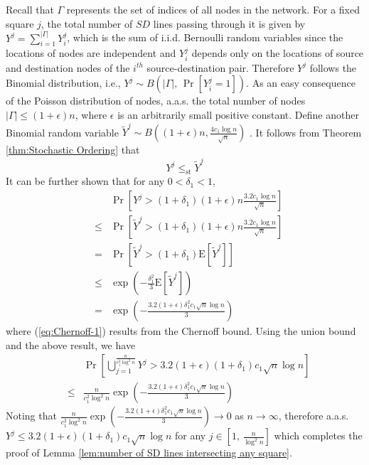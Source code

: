 \documentclass[english]{IEEEtran}
\theoremstyle{plain}
\theoremstyle{plain}
\theoremstyle{plain}
\theoremstyle{remark}
\begin{document}
Recall that $\Gamma$ represents the set of indices of all nodes in
the network. For a fixed square $j$, the total number of $SD$ lines
passing through it is given by $Y^{j}=\sum_{i=1}^{\left|\Gamma\right|}Y_{i}^{j}$,
which is the sum of i.i.d. Bernoulli random variables since the locations
of nodes are independent and $Y_{i}^{j}$ depends only on the locations
of source and destination nodes of the $i^{th}$ source-destination
pair. Therefore $Y^{j}$ follows the Binomial distribution, i.e.,
$Y^{j}\sim B\left(\left|\Gamma\right|,\,\Pr\left[Y_{i}^{j}=1\right]\right)$.
As an easy consequence of the Poisson distribution of nodes, a.a.s.
the total number of nodes $\left|\Gamma\right|\leq\left(1+\epsilon\right)n$,
where $\epsilon$ is an arbitrarily small positive constant. Define
another Binomial random variable $\tilde{Y}^{j}\sim B\left(\left(1+\epsilon\right)n,\frac{4c_{1}\log n}{\sqrt{n}}\right)$
. It follows from Theorem \ref{thm:Stochastic Ordering} that
\[
Y^{j}\leq_{\textrm{st}}\tilde{Y}^{j}
\]
It can be further shown that for any $0<\delta_{1}<1$,
\begin{eqnarray}
 &  & \Pr\left[Y^{j}>\left(1+\delta_{1}\right)\left(1+\epsilon\right)n\frac{3.2c_{1}\log n}{\sqrt{n}}\right]\nonumber \\
 & \leq & \Pr\left[\tilde{Y}^{j}>\left(1+\delta_{1}\right)\left(1+\epsilon\right)n\frac{3.2c_{1}\log n}{\sqrt{n}}\right]\nonumber \\
 & = & \Pr\left[\tilde{Y}^{j}>\left(1+\delta_{1}\right)\textrm{E}\left[\tilde{Y}^{j}\right]\right]\nonumber \\
 & \leq & \exp\left(-\frac{\delta_{1}^{2}}{3}\textrm{E}\left[\tilde{Y}^{j}\right]\right)\label{eq:Chernoff-1}\\
 & = & \exp\left(-\frac{3.2\left(1+\epsilon\right)\delta_{1}^{2}c_{1}\sqrt{n}\log n}{3}\right)
\end{eqnarray}
where (\ref{eq:Chernoff-1}) results from the Chernoff bound. Using
the union bound and the above result, we have
\begin{eqnarray}
 &  & \Pr\left[\bigcup_{j=1}^{\frac{n}{c_{1}^{2}\log^{2}n}}Y^{j}>3.2\left(1+\epsilon\right)\left(1+\delta_{1}\right)c_{1}\sqrt{n}\log n\right]\nonumber \\
 & \leq & \frac{n}{c_{1}^{2}\log^{2}n}\exp\left(-\frac{3.2\left(1+\epsilon\right)\delta_{1}^{2}c_{1}\sqrt{n}\log n}{3}\right)\label{eq:union bound-1}
\end{eqnarray}
Noting that $\frac{n}{c_{1}^{2}\log^{2}n}\exp\left(-\frac{3.2\left(1+\epsilon\right)\delta_{1}^{2}c_{1}\sqrt{n}\log n}{3}\right)\rightarrow0$
as $n\rightarrow\infty$, therefore a.a.s. $Y^{j}\leq3.2\left(1+\epsilon\right)\left(1+\delta_{1}\right)c_{1}\sqrt{n}\log n$
for any $j\in\left[1,\,\frac{n}{\log^{2}n}\right]$ which completes
the proof of Lemma \ref{lem:number of SD lines intersecting any square}.
\end{document}

